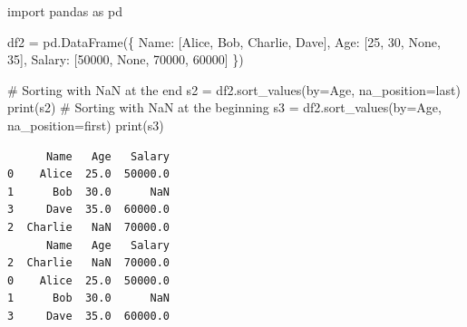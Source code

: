 \documentclass[
  english,
  letterpaper,
  DIV=11,
  numbers=noendperiod]{scrreprt}
\newenvironment{Shaded}{\begin{snugshade}}{\end{snugshade}}
\newcommand{\BuiltInTok}[1]{\textcolor[rgb]{0.00,0.23,0.31}{#1}}
\newcommand{\CommentTok}[1]{\textcolor[rgb]{0.37,0.37,0.37}{#1}}
\newcommand{\DecValTok}[1]{\textcolor[rgb]{0.68,0.00,0.00}{#1}}
\newcommand{\ImportTok}[1]{\textcolor[rgb]{0.00,0.46,0.62}{#1}}
\newcommand{\NormalTok}[1]{\textcolor[rgb]{0.00,0.23,0.31}{#1}}
\newcommand{\OperatorTok}[1]{\textcolor[rgb]{0.37,0.37,0.37}{#1}}
\newcommand{\StringTok}[1]{\textcolor[rgb]{0.13,0.47,0.30}{#1}}
\newcommand{\VariableTok}[1]{\textcolor[rgb]{0.07,0.07,0.07}{#1}}
\begin{document}
\begin{Shaded}
\begin{Highlighting}[]
\ImportTok{import}\NormalTok{ pandas }\ImportTok{as}\NormalTok{ pd}

\NormalTok{df2 }\OperatorTok{=}\NormalTok{ pd.DataFrame(\{}
    \StringTok{\textquotesingle{}Name\textquotesingle{}}\NormalTok{: [}\StringTok{\textquotesingle{}Alice\textquotesingle{}}\NormalTok{, }\StringTok{\textquotesingle{}Bob\textquotesingle{}}\NormalTok{, }\StringTok{\textquotesingle{}Charlie\textquotesingle{}}\NormalTok{, }\StringTok{\textquotesingle{}Dave\textquotesingle{}}\NormalTok{],}
    \StringTok{\textquotesingle{}Age\textquotesingle{}}\NormalTok{: [}\DecValTok{25}\NormalTok{, }\DecValTok{30}\NormalTok{, }\VariableTok{None}\NormalTok{, }\DecValTok{35}\NormalTok{],}
    \StringTok{\textquotesingle{}Salary\textquotesingle{}}\NormalTok{: [}\DecValTok{50000}\NormalTok{, }\VariableTok{None}\NormalTok{, }\DecValTok{70000}\NormalTok{, }\DecValTok{60000}\NormalTok{]}
\NormalTok{\})}

\CommentTok{\# Sorting with NaN at the end}
\NormalTok{s2 }\OperatorTok{=}\NormalTok{ df2.sort\_values(by}\OperatorTok{=}\StringTok{\textquotesingle{}Age\textquotesingle{}}\NormalTok{, na\_position}\OperatorTok{=}\StringTok{\textquotesingle{}last\textquotesingle{}}\NormalTok{)}
\BuiltInTok{print}\NormalTok{(s2)}
\CommentTok{\# Sorting with NaN at the beginning}
\NormalTok{s3 }\OperatorTok{=}\NormalTok{ df2.sort\_values(by}\OperatorTok{=}\StringTok{\textquotesingle{}Age\textquotesingle{}}\NormalTok{, na\_position}\OperatorTok{=}\StringTok{\textquotesingle{}first\textquotesingle{}}\NormalTok{)}
\BuiltInTok{print}\NormalTok{(s3)}
\end{Highlighting}
\end{Shaded}

\begin{verbatim}
      Name   Age   Salary
0    Alice  25.0  50000.0
1      Bob  30.0      NaN
3     Dave  35.0  60000.0
2  Charlie   NaN  70000.0
      Name   Age   Salary
2  Charlie   NaN  70000.0
0    Alice  25.0  50000.0
1      Bob  30.0      NaN
3     Dave  35.0  60000.0
\end{verbatim}
\end{document}
